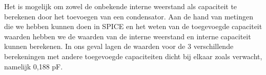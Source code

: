 \documentclass{article}
\begin{document}
Het is mogelijk om zowel de onbekende interne weerstand als capaciteit te berekenen door het toevoegen van een condensator. Aan de hand van metingen die we hebben kunnen doen in SPICE en het weten van de toegevoegde capaciteit waarden hebben we de waarden van de interne weerstand en interne capaciteit kunnen berekenen. In ons geval lagen de waarden voor de 3 verschillende berekeningen met andere toegevoegde capaciteiten dicht bij elkaar zoals verwacht, namelijk 0,188 pF.
\end{document}
